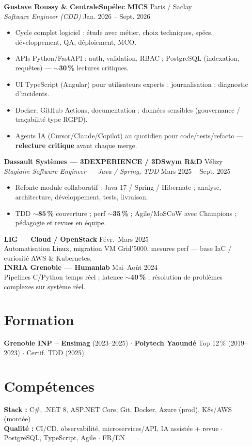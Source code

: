 \documentclass[10pt,a4paper]{article}
\begin{document}
\textbf{Gustave Roussy \& CentraleSup\'elec MICS} \hfill Paris / Saclay\\
\textit{Software Engineer (CDD)} \hfill Jan. 2026 -- Sept. 2026
\begin{itemize}
  \item Cycle complet logiciel : \'etude avec m\'etier, choix techniques, sp\'ecs, d\'eveloppement, QA, d\'eploiement, MCO.
  \item APIs Python/FastAPI : auth, validation, RBAC ; PostgreSQL (indexation, requ\^etes) --- $\sim$\textbf{30\,\%} lectures critiques.
  \item UI TypeScript (Angular) pour utilisateurs experts ; journalisation ; diagnostic d'incidents.
  \item Docker, GitHub Actions, documentation ; donn\'ees sensibles (gouvernance / tra\c{c}abilit\'e type RGPD).
  \item Agents IA (Cursor/Claude/Copilot) au quotidien pour code/tests/refacto --- \textbf{relecture critique} avant chaque merge.
\end{itemize}

\textbf{Dassault Syst\`emes --- 3DEXPERIENCE / 3DSwym R\&D} \hfill V\'elizy\\
\textit{Stagiaire Software Engineer --- Java / Spring, TDD} \hfill Mars 2025 -- Sept. 2025
\begin{itemize}
  \item Refonte module collaboratif : Java 17 / Spring / Hibernate ; analyse, architecture, d\'eveloppement, tests, livraison.
  \item TDD $\sim$\textbf{85\,\%} couverture ; perf $\sim$\textbf{35\,\%} ; Agile/MoSCoW avec Champions ; p\'edagogie et revues en \'equipe.
\end{itemize}

\textbf{LIG --- Cloud / OpenStack} \hfill F\'evr.--Mars 2025\\
Automatisation Linux, migration VM Grid'5000, mesures perf --- base IaC / curiosit\'e AWS \& Kubernetes.\\[1pt]
\textbf{INRIA Grenoble --- Humanlab} \hfill Mai--Ao\^ut 2024\\
Pipelines C/Python temps r\'eel ; latence $\sim$\textbf{40\,\%} ; r\'esolution de probl\`emes complexes sur syst\`eme r\'eel.

\section{Formation}
\textbf{Grenoble INP -- Ensimag} (2023--2025) $\cdot$ \textbf{Polytech Yaound\'e} Top 12\,\% (2019--2023) $\cdot$ Certif. TDD (2025)

\section{Comp\'etences}
\textbf{Stack :} C\#, .NET 8, ASP.NET Core, Git, Docker, Azure (prod), K8s/AWS (mont\'ee)\\
\textbf{Qualit\'e :} CI/CD, observabilit\'e, microservices/API, IA assist\'ee + revue $\cdot$ PostgreSQL, TypeScript, Agile $\cdot$ FR/EN
\end{document}
